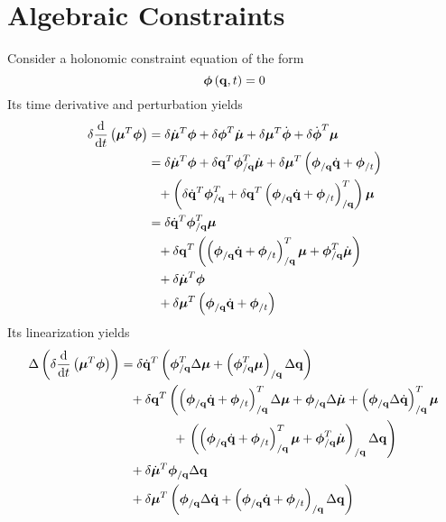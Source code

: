 \documentclass[10pt,dvips,fleqn,subeqn]{report}
\newcommand{\T}[1]{\bm{\mathbf{#1}}}
\begin{document}
\section{Algebraic Constraints}
Consider a holonomic constraint equation of the form
\begin{equation}
	\T{\phi}\plbr{\T{q}, t} = 0 
\end{equation}
Its time derivative and perturbation yields
\begin{align}
	\delta\frac{\llk{d}}{\llk{d}t}\plbr{\T{\mu}^T\T{\phi}} &=
		\delta\dot{\T{\mu}}^T \T{\phi}
		+ \delta\T{\phi}^T \dot{\T{\mu}}
		+ \delta\T{\mu}^T \dot{\T{\phi}}
		+ \delta\dot{\T{\phi}}^T \T{\mu} \nonumber \\
	&= \delta\dot{\T{\mu}}^T \T{\phi}
		+ \delta\T{q}^T \T{\phi}_{/\T{q}}^T \dot{\T{\mu}}
		+ \delta\T{\mu}^T\plbr{
			\T{\phi}_{/\T{q}} \dot{\T{q}}
			+ \T{\phi}_{/t}
		} \nonumber \\
	&\hphantom{=} + \plbr{
			\delta\dot{\T{q}}^T \T{\phi}_{/\T{q}}^T
			+ \delta\T{q}^T \plbr{
				\T{\phi}_{/\T{q}} \dot{\T{q}}
				+ \T{\phi}_{/t}
			}_{/\T{q}}^T
		} \T{\mu} \nonumber \\
	&= \delta\dot{\T{q}}^T \T{\phi}_{/\T{q}}^T \T{\mu} \nonumber \\
	&\hphantom{=} + \delta\T{q}^T \plbr{
		\plbr{
			\T{\phi}_{/\T{q}} \dot{\T{q}}
			+ \T{\phi}_{/t}
		}_{/\T{q}}^T \T{\mu}
		+ \T{\phi}_{/\T{q}}^T \dot{\T{\mu}}
	} \nonumber \\
	&\hphantom{=} + \delta\dot{\T{\mu}}^T \T{\phi} \nonumber \\
	&\hphantom{=} + \delta\T{\mu}^T \plbr{
		\T{\phi}_{/\T{q}} \dot{\T{q}}
		+ \T{\phi}_{/t}
	}
\end{align}
Its linearization yields
\begin{align}
	\Delta\plbr{\delta\frac{\llk{d}}{\llk{d}t}\plbr{\T{\mu}^T\T{\phi}}}
	&= \delta\dot{\T{q}}^T \plbr{
		\T{\phi}_{/\T{q}}^T \Delta\T{\mu}
		+ \plbr{\T{\phi}_{/\T{q}}^T \T{\mu}}_{/\T{q}} \Delta\T{q}
	} \nonumber \\
	&\hphantom{=} + \delta\T{q}^T \lplbr{
		\plbr{
			\T{\phi}_{/\T{q}} \dot{\T{q}}
			+ \T{\phi}_{/t}
		}_{/\T{q}}^T \Delta \T{\mu}
		+ \T{\phi}_{/\T{q}} \Delta\dot{\T{\mu}}
		+ \plbr{\T{\phi}_{/\T{q}} \Delta\dot{\T{q}}}_{/\T{q}}^T \T{\mu}
	} \nonumber \\
	&\hphantom{=}\hspace{12mm} + \rplbr{
		\plbr{
			\plbr{
				\T{\phi}_{/\T{q}} \dot{\T{q}}
				+ \T{\phi}_{/t}
			}_{/\T{q}}^T \T{\mu}
			+ \T{\phi}_{/\T{q}}^T \dot{\T{\mu}}
		}_{/\T{q}} \Delta\T{q}
	} \nonumber \\
	&\hphantom{=} + \delta\dot{\T{\mu}}^T \T{\phi}_{/\T{q}} \Delta\T{q} \nonumber \\
	&\hphantom{=} + \delta\T{\mu}^T \plbr{
		\T{\phi}_{/\T{q}} \Delta\dot{\T{q}}
		+ \plbr{
			\T{\phi}_{/\T{q}} \dot{\T{q}}
			+ \T{\phi}_{/t}
		}_{/\T{q}} \Delta\T{q}
	}
\end{align}
\end{document}
